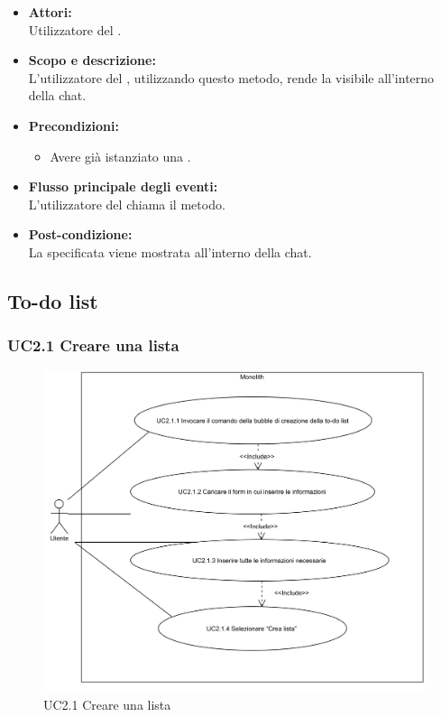 \begin{itemize}
	\item \textbf{Attori:}
	\\Utilizzatore del .
	\item \textbf{Scopo e descrizione:} 
	\\L'utilizzatore del , utilizzando questo metodo, rende la  visibile all'interno della chat.
	\item \textbf{Precondizioni:}
	\begin{itemize}
		\item Avere già istanziato una .
	\end{itemize}
	\item \textbf{Flusso principale degli eventi:}
	\\L'utilizzatore del  chiama il metodo.
	\item \textbf{Post-condizione:}
	\\La {} specificata viene mostrata all'interno della chat.
\end{itemize}

\subsection{To-do list}

\subsubsection{UC2.1 Creare una lista} \label{UC2.1}

\begin{figure}[H]
	\centering
	\includegraphics[width=15cm]{../../documenti/AnalisiDeiRequisiti/Diagrammi_img/uc2_1.png}
	\caption{UC2.1 Creare una lista}
\end{figure}


